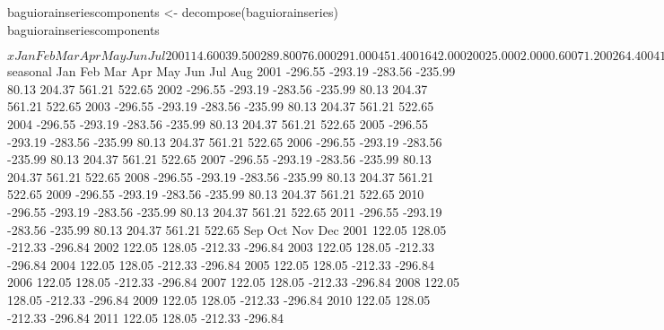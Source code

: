 \begin{center}
\begin{Schunk}
\begin{Sinput}
baguiorainseriescomponents <- decompose(baguiorainseries)
baguiorainseriescomponents
\end{Sinput}
\begin{Soutput}
$x
          Jan      Feb      Mar      Apr      May      Jun      Jul
2001   14.600   39.500  289.800   76.000  291.000  451.400 1642.000
2002    5.000    2.000    0.600   71.200  264.400  411.000 1883.400
2003    9.800   25.400    4.800   46.800  662.700  792.400  721.300
2004   17.000  128.600   79.870   37.800  428.600 1306.500  445.400
2005    0.200    0.000   54.600   32.000  291.000  425.700  292.400
2006  160.600    8.800   38.400   29.600  327.509  188.200 1769.800
2007    0.000    0.600   31.800   25.400  308.600  358.400  219.000
2008   24.000   97.000   78.700  149.800  839.800  302.000  681.200
2009    8.000   64.500   82.900  407.300  298.500  810.000  758.400
2010   10.037    5.499   15.300  148.600  248.600  254.000  543.700
2011   94.000   13.800   88.900   11.900  462.500  529.100  435.900
          Aug      Sep      Oct      Nov      Dec
2001  274.000  842.200   97.000   61.600   23.200
2002  525.600  301.500  224.800   67.300   10.000
2003 1089.400  303.200  179.700   60.400    4.400
2004 1432.900  225.600   42.400  114.500  154.900
2005  690.200  694.600  256.600   55.200   68.000
2006  735.800  207.600  316.000   72.400   43.200
2007 1201.600  408.400  410.300  444.800   21.600
2008  999.500  761.000  178.100   82.600    0.000
2009 1087.700  516.900 1981.800   22.200    0.000
2010  536.600  296.800  920.100  226.400   47.400
2011 1096.300  819.200  332.400   81.600   67.400

$seasonal
         Jan     Feb     Mar     Apr     May     Jun     Jul     Aug
2001 -296.55 -293.19 -283.56 -235.99   80.13  204.37  561.21  522.65
2002 -296.55 -293.19 -283.56 -235.99   80.13  204.37  561.21  522.65
2003 -296.55 -293.19 -283.56 -235.99   80.13  204.37  561.21  522.65
2004 -296.55 -293.19 -283.56 -235.99   80.13  204.37  561.21  522.65
2005 -296.55 -293.19 -283.56 -235.99   80.13  204.37  561.21  522.65
2006 -296.55 -293.19 -283.56 -235.99   80.13  204.37  561.21  522.65
2007 -296.55 -293.19 -283.56 -235.99   80.13  204.37  561.21  522.65
2008 -296.55 -293.19 -283.56 -235.99   80.13  204.37  561.21  522.65
2009 -296.55 -293.19 -283.56 -235.99   80.13  204.37  561.21  522.65
2010 -296.55 -293.19 -283.56 -235.99   80.13  204.37  561.21  522.65
2011 -296.55 -293.19 -283.56 -235.99   80.13  204.37  561.21  522.65
         Sep     Oct     Nov     Dec
2001  122.05  128.05 -212.33 -296.84
2002  122.05  128.05 -212.33 -296.84
2003  122.05  128.05 -212.33 -296.84
2004  122.05  128.05 -212.33 -296.84
2005  122.05  128.05 -212.33 -296.84
2006  122.05  128.05 -212.33 -296.84
2007  122.05  128.05 -212.33 -296.84
2008  122.05  128.05 -212.33 -296.84
2009  122.05  128.05 -212.33 -296.84
2010  122.05  128.05 -212.33 -296.84
2011  122.05  128.05 -212.33 -296.84


\end{Soutput}
\end{Schunk}
\end{center}
